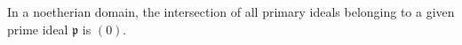 In a noetherian domain, the intersection of all primary ideals belonging to a given prime ideal $\mathfrak{p}$ is $(0)$.
